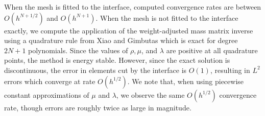 \documentclass{siamart0216}
\begin{document}
When the mesh is fitted to the interface, computed convergence rates are between $O(h^{N+1/2})$ and $O(h^{N+1})$.  When the mesh is not fitted to the interface exactly, we compute the application of the weight-adjusted mass matrix inverse using a quadrature rule from Xiao and Gimbutas \cite{xiao2010quadrature} which is exact for degree $2N+1$ polynomials.  Since the values of $\rho,\mu$, and $\lambda$ are positive at all quadrature points, the method is energy stable.  However, since the exact solution is discontinuous, the error in elements cut by the interface is $O(1)$, resulting in $L^2$ errors which converge at rate $O(h^{1/2})$.  We note that, when using piecewise constant approximations of $\mu$ and $\lambda$, we observe the same $O(h^{1/2})$ convergence rate, though errors are roughly twice as large in magnitude.  
\end{document}
